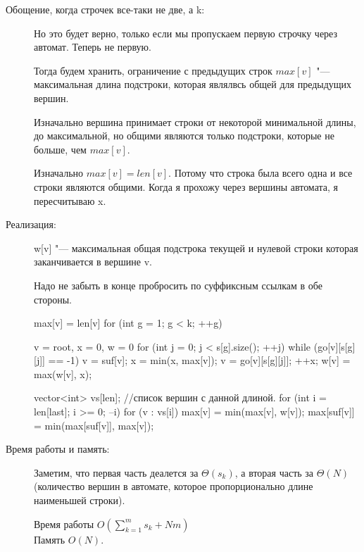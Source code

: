 \begin{description}
    \item [Обощение, когда строчек все-таки не две, а k:]
    Но это будет верно, только если мы пропускаем первую строчку через автомат. 
    Теперь не первую. 

    Тогда будем хранить, ограничение с предыдущих строк $max[v]$ "--- максимальная длина 
    подстроки, которая являлвсь общей для предыдущих вершин. 

    Изначально вершина принимает строки от некоторой 
    минимальной длины, до максимальной, но общими являются только подстроки, 
    которые не больше, чем $max[v]$.

    Изначально $max[v] = len[v]$. Потому что строка была всего одна и 
    все строки являются общими. Когда я прохожу через вершины автомата, я пересчитываю x.     
    
    \item[Реализация:] 
    
    w[v] "--- максимальная общая подстрока текущей и нулевой строки которая заканчивается в вершине v. 

    Надо не забыть в конце пробросить по суффиксным ссылкам в обе стороны. 

    \begin{cppcode}
    max[v] = len[v]
    for (int g = 1; g < k; ++g) {
        v = root, x = 0, w = {0}
        for (int j = 0; j < s[g].size(); ++j) {
            while (go[v][s[g][j]] == -1) {
                v = suf[v];
                x = min(x, max[v]);
            }
            v = go[v][s[g][j]];
            ++x;
            w[v] = max(w[v], x);
        }

        vector<int> vs[len]; //список вершин с данной длиной.
        for (int i = len[last]; i >= 0; --i) {
            for (v : vs[i]) {
                max[v] = min(max[v], w[v]);
                max[suf[v]] = min(max[suf[v]], max[v]);
            }
        }
    }
    \end{cppcode}
    
    \item[Время работы и память:] 
    Заметим, что первая часть деалется за $\Theta(s_k)$, 
    а вторая часть за $\Theta(N)$(количество вершин в автомате, которое 
    пропорционально длине наименьшей строки). 

    Время работы $O(\sum_{k = 1}^{m}s_k + Nm)$ \\
    
    Память $O(N)$.
    \end{description}

